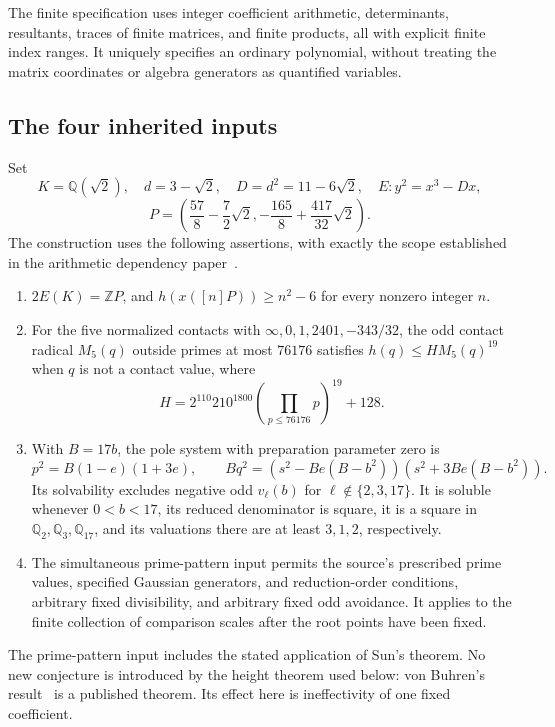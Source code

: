 \documentclass[11pt,a4paper]{article}
\newcommand{\Q}{\mathbb Q}\newcommand{\Z}{\mathbb Z}
\begin{document}
The finite specification uses integer coefficient arithmetic,
determinants, resultants, traces of finite matrices, and finite
products, all with explicit finite index ranges. It uniquely
specifies an ordinary polynomial, without treating the matrix
coordinates or algebra generators as quantified variables.

\subsection{The four inherited inputs}\label{sec:inputs}

Set
\[
 K=\Q(\sqrt2),\quad d=3-\sqrt2,\quad D=d^2=11-6\sqrt2,
 \quad E:y^2=x^3-Dx,
\]
\[
 P=\left(\frac{57}{8}-\frac72\sqrt2,
          -\frac{165}{8}+\frac{417}{32}\sqrt2\right).
\]
The construction uses the following assertions, with exactly the
scope established in the arithmetic dependency paper~\cite{Dependencies}.
\begin{enumerate}
\item $2E(K)=\Z P$, and $h(x([n]P))\ge n^2-6$ for every
      nonzero integer $n$.
\item For the five normalized contacts with
      $\infty,0,1,2401,-343/32$, the odd contact radical
      $M_5(q)$ outside primes at most $76176$ satisfies
      $h(q)\le H M_5(q)^{19}$ when $q$ is not a contact value,
      where
\[
 H=2^{110}210^{1800}\left(\prod_{p\le76176}p\right)^{19}+128.
\]
\item With $B=17b$, the pole system with preparation parameter
      zero is
\[
 p^2=B(1-e)(1+3e),\qquad
 Bq^2=(s^2-Be(B-b^2))(s^2+3Be(B-b^2)).
\]
      Its solvability excludes negative odd $v_\ell(b)$ for
      $\ell\notin\{2,3,17\}$. It is soluble whenever
      $0<b<17$, its reduced denominator is square, it is a
      square in $\Q_2,\Q_3,\Q_{17}$, and its valuations there
      are at least $3,1,2$, respectively.
\item The simultaneous prime-pattern input permits the source's
      prescribed prime values, specified Gaussian generators, and reduction-order
      conditions, arbitrary fixed divisibility, and arbitrary
      fixed odd avoidance. It applies to the finite collection
      of comparison scales after the root points have been fixed.
\end{enumerate}
The prime-pattern input includes the stated application of Sun's
theorem. No new conjecture is introduced by the height theorem
used below: von Buhren's result~\cite{VonBuhren} is a published
theorem. Its effect here is ineffectivity of one fixed coefficient.
\end{document}
